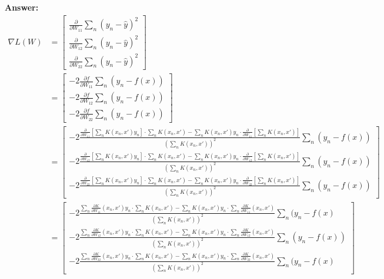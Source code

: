 \documentclass[submit]{harvardml}
\begin{document}
\begin{enumerate}
\textbf{Answer:}
\begin{equation}
  \begin{split}
        \nabla L(W) &= \begin{bmatrix}\frac{\partial}{\partial W_{11}}\sum_{n} (y_n - \hat{y} )^2 \\
        \frac{\partial}{\partial W_{12}}\sum_{n} (y_n - \hat{y} )^2  \\
        \frac{\partial}{\partial W_{22}}\sum_{n} (y_n - \hat{y} )^2 \end{bmatrix}\\
        &= \begin{bmatrix}- 2 \frac{\partial f}{\partial W_{11}}\sum_{n} (y_n - f(x) )\\
        - 2 \frac{\partial f}{\partial W_{12}}\sum_{n} (y_n - f(x) )\\
        - 2 \frac{\partial f}{\partial W_{22}}\sum_{n} (y_n - f(x) )\end{bmatrix}\\
        &= \begin{bmatrix}-2 \frac {\frac{\partial}{\partial W_{11}}[\sum_{n} K(x_n, x')y_n]\cdot \sum_n K (x_n,x') - \sum_{n} K (x_n, x')y_n \cdot \frac{\partial}{\partial W_{11}} [\sum_{n} K (x_n, x')]}{(\sum_{n} K (x_n, x'))^2}\sum_{n} (y_n - f(x) )\\
        -2 \frac {\frac{\partial}{\partial W_{12}}[\sum_{n} K(x_n, x')y_n]\cdot \sum_n K (x_n,x') - \sum_{n} K (x_n, x')y_n \cdot \frac{\partial}{\partial W_{12}} [\sum_{n} K (x_n, x')]}{(\sum_{n} K (x_n, x'))^2}\sum_{n} (y_n - f(x) )\\
        -2 \frac {\frac{\partial}{\partial W_{22}}[\sum_{n} K(x_n, x')y_n]\cdot \sum_n K (x_n,x') - \sum_{n} K (x_n, x')y_n \cdot \frac{\partial}{\partial W_{22}} [\sum_{n} K (x_n, x')]}{(\sum_{n} K (x_n, x'))^2}\sum_{n} (y_n - f(x) )\end{bmatrix}\\
        &= \begin{bmatrix}-2 \frac {\sum_{n} \frac{\partial K}{\partial W_{11}} (x_n, x')y_n \cdot \sum_n K (x_n,x') - \sum_{n} K (x_n, x')y_n \cdot \sum_{n} \frac{\partial K}{\partial W_{11}} (x_n, x')}{(\sum_{n} K (x_n, x'))^2}\sum_{n} (y_n - f(x) \\
        -2 \frac {\sum_{n} \frac{\partial K}{\partial W_{12}} (x_n, x')y_n \cdot \sum_n K (x_n,x') - \sum_{n} K (x_n, x')y_n \cdot \sum_{n} \frac{\partial K}{\partial W_{12}} (x_n, x')}{(\sum_{n} K (x_n, x'))^2}\sum_{n} (y_n - f(x))\\
        -2 \frac {\sum_{n} \frac{\partial K}{\partial W_{22}} (x_n, x')y_n \cdot \sum_n K (x_n,x') - \sum_{n} K (x_n, x')y_n \cdot \sum_{n} \frac{\partial K}{\partial W_{22}} (x_n, x')}{(\sum_{n} K (x_n, x'))^2}\sum_{n} (y_n - f(x)

\end{bmatrix}
\end{split}
\end{equation}
\end{enumerate}
\end{document}
